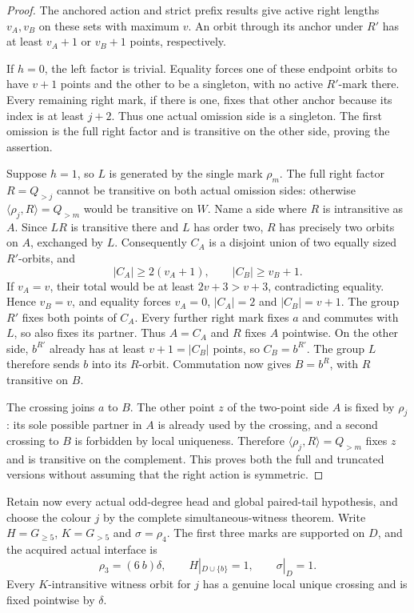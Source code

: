 \documentclass[11pt,a4paper]{article}
\newcommand{\gen}[1]{\langle#1\rangle}
\begin{document}
\begin{proof}
The anchored action and strict prefix results
give active right lengths $v_A,v_B$ on these
sets with maximum $v$. An orbit through its
anchor under $R'$ has at least $v_A+1$ or
$v_B+1$ points, respectively.

If $h=0$, the left factor is trivial. Equality
forces one of these endpoint orbits to have
$v+1$ points and the other to be a singleton,
with no active $R'$-mark there. Every remaining
right mark, if there is one, fixes that other
anchor because its index is at least $j+2$.
Thus one actual omission side is a singleton.
The first omission is the full right factor
and is transitive on the other side, proving
the assertion.

Suppose $h=1$, so $L$ is generated by the
single mark $\rho_m$. The full right factor
$R=Q_{>j}$ cannot be transitive on both actual
omission sides: otherwise $\gen{\rho_j,R}=Q_{>m}$
would be transitive on $W$. Name a side where
$R$ is intransitive as $A$. Since $LR$ is
transitive there and $L$ has order two, $R$
has precisely two orbits on $A$, exchanged by
$L$. Consequently $C_A$ is a disjoint union
of two equally sized $R'$-orbits, and
\[
                   |C_A|\ge2(v_A+1),\qquad
                   |C_B|\ge v_B+1.
\]
If $v_A=v$, their total would be at least
$2v+3>v+3$, contradicting equality. Hence
$v_B=v$, and equality forces $v_A=0$,
$|C_A|=2$ and $|C_B|=v+1$.
The group $R'$ fixes both points of $C_A$.
Every further right mark fixes $a$ and commutes
with $L$, so also fixes its partner. Thus
$A=C_A$ and $R$ fixes $A$ pointwise.
On the other side, $b^{R'}$ already has at
least $v+1=|C_B|$ points, so $C_B=b^{R'}$.
The group $L$ therefore sends $b$ into its
$R$-orbit. Commutation now gives $B=b^R$,
with $R$ transitive on $B$.

The crossing joins $a$ to $B$. The other point
$z$ of the two-point side $A$ is fixed by
$\rho_j$: its sole possible partner in $A$
is already used by the crossing, and a second
crossing to $B$ is forbidden by local uniqueness. Therefore
$\gen{\rho_j,R}=Q_{>m}$ fixes $z$ and is
transitive on the complement. This proves
both the full and truncated versions without
assuming that the right action is symmetric.
\end{proof}

Retain now every actual odd-degree head and global
paired-tail hypothesis, and choose the colour $j$
by the complete simultaneous-witness theorem.
Write $H=G_{\ge5}$, $K=G_{>5}$ and
$\sigma=\rho_4$. The first three marks are
supported on $D$, and the acquired actual interface is
\[
 \rho_3=(6\ b)\delta,\qquad H|_{D\cup\{b\}}=1,
 \qquad \sigma|_D=1.
\]
Every $K$-intransitive witness orbit for $j$ has a
genuine local unique crossing and is fixed pointwise
by $\delta$.
\end{document}
